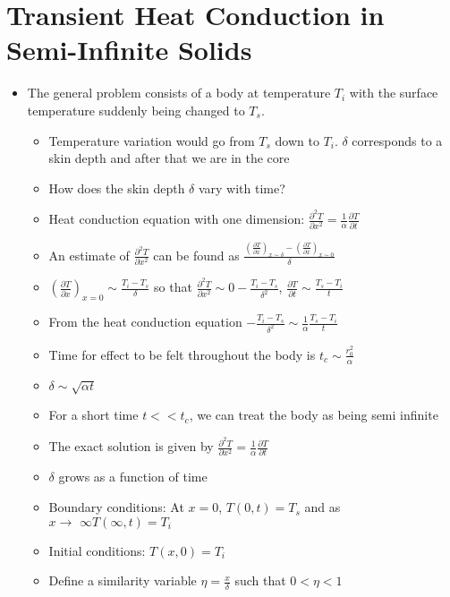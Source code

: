 \documentclass[12pt]{article}
\begin{document}
\section{Transient Heat Conduction in Semi-Infinite Solids} 
\begin{itemize}
    \item The general problem consists of a body at temperature $T_i$ with the surface temperature suddenly being changed to $T_s$.  \begin{itemize}
        \item Temperature variation would go from $T_s$ down to $T_i$. $\delta$ corresponds to a skin depth and after that we are in the core 
        \item How does the skin depth $\delta$ vary with time?
        \item Heat conduction equation with one dimension: $\frac{\partial^2 T}{\partial x^2} = \frac{1}{\alpha} \frac{\partial T}{\partial t}$
        \item An estimate of $\frac{\partial^2 T}{\partial x^2}$ can be found as $\frac{(\frac{\partial T}{\partial x})_{x \sim \delta} - (\frac{\partial T}{\partial x})_{x \sim 0} }{\delta}$
        \item $(\frac{\partial T}{\partial x})_{x = 0} \sim \frac{T_i - T_s}{\delta}$ so that $\frac{\partial^2 T}{\partial x^2} \sim 0 - \frac{T_i - T_s}{\delta ^2}$, $\frac{\partial T}{\partial t} \sim \frac{T_s - T_i}{t}$
        \item From the heat conduction equation $- \frac{T_i - T_s}{\delta ^2} \sim \frac{1}{\alpha} \frac{T_s - T_i}{t}$ 
        \item Time for effect to be felt throughout the body is $t_c \sim \frac{r_0^2}{\alpha}$
        \item $\delta \sim \sqrt{\alpha t} $
        \item For a short time $t << t_c$, we can treat the body as being semi infinite
        \item The exact solution is given by $\frac{\partial^2 T}{\partial x^2} = \frac{1}{\alpha} \frac{\partial T}{\partial t}$
        \item $\delta$ grows as a function of time
        \item Boundary conditions: At $x= 0$, $T(0, t) = T_s$ and as $x \rightarrow \, \, \infty  T(\infty, t) = T_i$
        \item Initial conditions: $T(x, 0) = T_i$
        \item Define a similarity variable $\eta = \frac{x}{\delta}$ such that $0 < \eta < 1$

\end{itemize}
\end{itemize}
\end{document}
